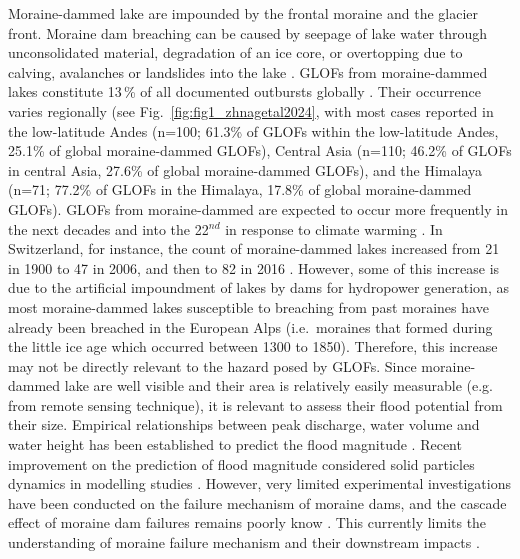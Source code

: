 Moraine-dammed lake are impounded by the frontal moraine and the glacier front. Moraine dam breaching can be caused by seepage of lake water through unconsolidated material, degradation of an ice core, or overtopping due to calving, avalanches or landslides into the lake \citep{Tweed&Russel1999,Emmer&al2022}. GLOFs from moraine-dammed lakes constitute 13\,\% of all documented outbursts globally \citep{Lutzow&al2023}. Their occurrence varies regionally (see Fig.~\ref{fig:fig1_zhnagetal2024}, with most cases reported in the low-latitude Andes (n=100; 61.3\% of GLOFs within the low-latitude Andes, 25.1\% of global moraine-dammed GLOFs), Central Asia (n=110; 46.2\% of GLOFs in central Asia, 27.6\% of global moraine-dammed GLOFs), and the Himalaya (n=71; 77.2\% of GLOFs in the Himalaya, 17.8\% of global moraine-dammed GLOFs). GLOFs from moraine-dammed are expected to occur more frequently in the next decades and into the 22$^{nd}$ in response to climate warming \citep{Harrison&al2018}. In Switzerland, for instance, the count of moraine-dammed lakes increased from 21 in 1900 to 47 in 2006, and then to 82 in 2016 \citep{Zhang&al2024}. However, some of this increase is due to the artificial impoundment of lakes by dams for hydropower generation, as most moraine-dammed lakes susceptible to breaching from past moraines have already been breached in the European Alps (i.e.\ moraines that formed during the little ice age which occurred between 1300 to 1850). Therefore, this increase may not be directly relevant to the hazard posed by GLOFs.%
Since moraine-dammed lake are well visible and their area is relatively easily measurable (e.g. from remote sensing technique), it is relevant to assess their flood potential from their size. Empirical relationships between peak discharge, water volume and water height has been established to predict the flood magnitude \citep[see][for a review on moraine-dammed lake failure]{Neupane&al2019}. Recent improvement on the prediction of flood magnitude considered solid particles dynamics in modelling studies \citep[e.g.][]{Mergili&al2018}. However, very limited experimental investigations have been conducted on the failure mechanism of moraine dams, and the cascade effect of moraine dam failures remains poorly know \citep{Somos-Valenzuelas&al2016}. This currently limits the understanding of moraine failure mechanism and their downstream impacts \citep{Neupane&al2019}. 

